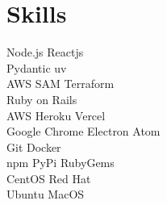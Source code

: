 \documentclass[]{resume}
\begin{document}
%
%
\header

%
%
\begin{minipage}[t]{0.25\textwidth}




\section{Skills}
Node.js \textbullet{} Reactjs \\
Pydantic \textbullet{} uv \\
AWS SAM \textbullet{} Terraform \\
Ruby on Rails \\

AWS \textbullet{} Heroku \textbullet{} Vercel \\
Google Chrome \textbullet{} Electron \textbullet{} Atom \\

Git \textbullet{} Docker \\
npm \textbullet{} PyPi \textbullet{} RubyGems \\

CentOS \textbullet{} Red Hat \\
Ubuntu \textbullet{} MacOS \\


\end{minipage}
\end{document}
